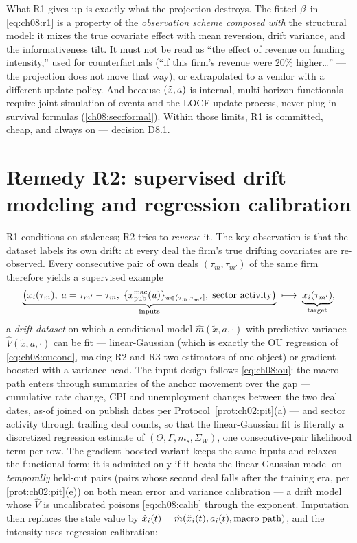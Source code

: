 What R1 gives up is exactly what the projection destroys. The fitted
$\beta$ in \cref{eq:ch08:r1} is a property of the \emph{observation
scheme composed with} the structural model: it mixes the true covariate
effect with mean reversion, drift variance, and the informativeness
tilt. It must not be read as ``the effect of revenue on funding
intensity,'' used for counterfactuals (``if this firm's revenue were
$20\%$ higher\dots'' --- the projection does not move that way), or
extrapolated to a vendor with a different update policy. And because
$(\tilde{x},a)$ is internal, multi-horizon functionals require
joint simulation of events and the LOCF update process, never plug-in
survival formulas (\cref{ch08:sec:formal}). Within those limits, R1 is
committed, cheap, and always on --- decision D8.1.

\section{Remedy R2: supervised drift modeling and regression
calibration}\label{ch08:sec:r2}

R1 conditions on staleness; R2 tries to \emph{reverse} it. The key
observation is that the dataset labels its own drift: at every deal the
firm's true drifting covariates are re-observed. Every consecutive pair
of own deals $(\tau_m, \tau_{m'})$ of the same firm therefore yields a
supervised example
\[
\underbrace{\big(x_i(\tau_m),\; a = \tau_{m'} - \tau_m,\;
\{x^{\mathrm{mac}}_{\mathrm{pub}}(u)\}_{u \in (\tau_m, \tau_{m'}]},\;
\text{sector activity}\big)}_{\text{inputs}}
\;\longmapsto\;
\underbrace{x_i(\tau_{m'})}_{\text{target}},
\]
a \emph{drift dataset} on which a conditional model $\hat m(\tilde x, a,
\cdot)$ with predictive variance $\hat V(\tilde x, a, \cdot)$ can be fit
--- linear-Gaussian (which is exactly the OU regression of
\cref{eq:ch08:oucond}, making R2 and R3 two estimators of one object) or
gradient-boosted with a variance head. The input design follows
\cref{eq:ch08:ou}: the macro path enters through summaries of the anchor
movement over the gap --- cumulative rate change, CPI and unemployment
changes between the two deal dates, as-of joined on publish dates per
Protocol~\ref{prot:ch02:pit}(a) --- and sector activity through trailing
deal counts, so that the linear-Gaussian fit is literally a discretized
regression estimate of $(\Theta, \Gamma, m_s, \Sigma_W)$, one
consecutive-pair likelihood term per row. The gradient-boosted variant
keeps the same inputs and relaxes the functional form; it is admitted
only if it beats the linear-Gaussian model on \emph{temporally} held-out
pairs (pairs whose second deal falls after the training era, per
\cref{prot:ch02:pit}(e)) on both mean error and variance calibration ---
a drift model whose $\hat V$ is uncalibrated poisons
\cref{eq:ch08:calib} through the exponent. Imputation then replaces the
stale value by $\hat{x}_i(t) = \hat m(\tilde{x}_i(t),
a_i(t), \text{macro path})$, and the intensity uses regression
calibration:

